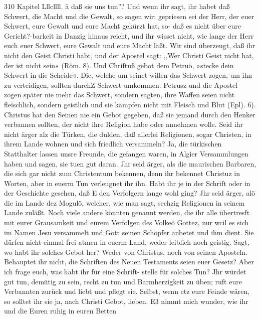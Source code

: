 310 Kapitel Lllcllll. ä
daß sie uns tun''? Und wenn ihr sagt, ihr habet daß Schwert,
die Macht und die Gewalt, so sagen wir: gepriesen sei der Herr,
der euer Schwert, eure Gewalt und eure Macht gekürzt hat, so-
daß es nicht über eure Gericht?-barkeit in Danzig hinaus reicht,
und ihr wisset nicht, wie lange der Herr euch euer Schwert, eure
Gewalt und eure Macht läßt. Wir sind überzeugt, daß ihr nicht
den Geist Christi habt, und der Apostel sagt: ,,Wer Christi Geist
nicht hat, der ist nicht sein« (Röm. 8). Und Chriftuß gebot dem
Petruö, »stecke dein Schwert in die Scheide«. Die, welche um
seinet willen das Schwert zogen, um ihn zu verteidigen, sollten
durchZ Schwert umkommen. Petrusz und die Apostel zogen später
nie mehr das Schwert, sondern sagten, ihre Waffen seien nicht
fleischlich, sondern geistlich und sie kämpfen nicht mit Fleisch und
Blut (Epl). 6). Christus hat den Seinen nie ein Gebot gegeben,
daß sie jemand durch den Henker verbannen sollten, der nicht
ihre Religion habe oder annehmen wolle. Seid ihr nicht ärger
alz die Türken, die dulden, daß allerlei Religionen, sogar Christen,
in ihrem Lande wohnen und sich friedlich versammeln? Ja, die
türkischen Statthalter lassen unsre Freunde, die gefangen waren,
in Algier Versammlungen haben und sagen, sie tuen gut daran.
Jhr seid ärger, als die maurischen Barbaren, die sich gar nicht
zum Christentum bekennen, denn ihr bekennet Christuz in Worten,
aber in euerm Tun verleugnet ihr ihn. Habt ihr je in der Schrift
oder in der Geschichte gesehen, daß E den Verfolgern lange wohl
ging? Jhr seid ärger, alö die im Lande dez Mogulö, welcher,
wie man sagt, sechzig Religionen in seinem Lande zuläßt. Noch
viele andere könnten genannt werden, die ihr alle übertresft mit
eurer Grausamkeit und eurem Verfolgen des Volkeö Gottez, nur
wcil es sich im Namen Jesu versammelt und Gott seinen Schöpfer
anbetet und ihm dient. Sie dürfen nicht einmal frei atmen in
euerm Land, weder leiblich noch geistig. Sagt, wo habt ihr
solches Gebot her? Weder von Christus, noch von seinen Aposteln.
Behauptet ihr nicht, die Schriften des Neuen Testaments seien
euer Gesetz? Aber ich frage euch, was habt ihr für eine Schrift-
stelle für solches Tun? Jhr würdet gut tun, demütig zu sein,
recht zu tun und Barmherzigkeit zu üben; ruft eure Verbannten
zurück und liebt und pflegt sie. Selbst, wenn etz eure Feinde
wären, so solltet ihr sie ja, nach Christi Gebot, lieben. E3 nimmt
mich wunder, wie ihr und die Euren ruhig in euren Betten


